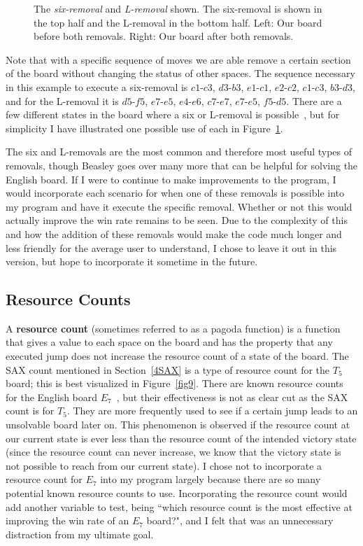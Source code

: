 \documentclass{article}
\begin{document}
\begin{figure}[htb]
\centering
{}
\caption{The \textit{six-removal} and \textit{L-removal} shown.  The six-removal is shown in the top half and the L-removal in the bottom half. Left:  Our board before both removals. Right: Our board after both removals.}
\label{fig10}
\end{figure}

Note that with a specific sequence of moves we are able remove a certain section of the board without changing the status of other spaces. The sequence necessary in this example to execute a six-removal is $c1$-$c3$, $d3$-$b3$, $e1$-$c1$, $e2$-$c2$, $c1$-$c3$, $b3$-$d3$, and for the L-removal it is $d5$-$f5$, $e7$-$e5$, $e4$-$e6$, $c7$-$e7$, $e7$-$e5$, $f5$-$d5$. There are a few different states in the board where a six or L-removal is possible~\cite{Beasley}, but for simplicity I have illustrated one possible use of each in Figure~\ref{fig10}.

The six and L-removals are the most common and therefore most useful types of removals, though Beasley goes over many more that can be helpful for solving the English board. If I were to continue to make improvements to the program, I would incorporate each scenario for when one of these removals is possible into my program and have it execute the specific removal. Whether or not this would actually improve the win rate remains to be seen. Due to the complexity of this and how the addition of these removals would make the code much longer and less friendly for the average user to understand, I chose to leave it out in this version, but hope to incorporate it sometime in the future.

\subsection{Resource Counts}
A \textbf{resource count} (sometimes referred to as a pagoda function) is a function that gives a value to each space on the board and has the property that any executed jump does not increase the resource count of a state of the board. The SAX count mentioned in Section~\ref{4SAX} is a type of resource count for the $T_5$ board; this is best visualized in Figure~\ref{fig9}. There are known resource counts for the English board $E_7$~\cite{Beasley}, but their effectiveness is not as clear cut as the SAX count is for $T_5$. They are more frequently used to see if a certain jump leads to an unsolvable board later on. This phenomenon is observed if the resource count at our current state is ever less than the resource count of the intended victory state (since the resource count can never increase, we know that the victory state is not possible to reach from our current state). I chose not to incorporate a resource count for $E_7$ into my program largely because there are so many potential known resource counts to use. Incorporating the resource count would add another variable to test, being ``which resource count is the most effective at improving the win rate of an $E_7$ board?", and I felt that was an unnecessary distraction from my ultimate goal.
\end{document}
